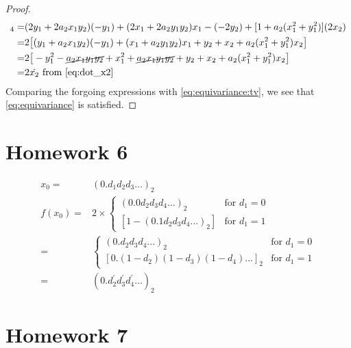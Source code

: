 \documentclass[]{article}
\begin{document}
\begin{proof}
	\begin{align*}
		[A(\vec{x}) t(\vec{x})]_4 =& (2y_1+2a_2x_1y_2)(-y_1) + (2x_1+2a_2y_1y_2)x_1 - (-2 y_2) + [1+a_2(x_1^2+ y_1^2)](2x_2)\\
		=&2\big[(y_1+a_2x_1y_2)(-y_1) + (x_1+a_2y_1y_2)x_1 + y_2 + x_2+a_2(x_1^2+ y_1^2)x_2\big]\\
		=&2\big[-y_1^2 - \cancel{a_2 x_1 y_1 y_2} +x_1^2 +  \cancel{a_2 x_1 y_1 y_2} + y_2 + x_2+ a_2(x_1^2+ y_1^2)x_2\big]\\
		=& 2 \dot{x_2}  \text{ from \eqref{eq:dot_x2}}
	\end{align*}
	Comparing the forgoing expressions with \eqref{eq:equivariance:tv}, we see that \eqref{eq:equivariance} is satisfied.
\end{proof}
\section{Homework 6}

\begin{align*}
	x_0 =& (0.d_1 d_2 d_3 ...)_2\\
	f(x_0) =& 2 \times \begin{cases}
		(0.0 d_2 d_3 d_4...)_2 & \text{for } d_1 = 0\\
		[1- (0.1 d_2 d_3 d_4...)_2] & \text{for } d_1 = 1
	\end{cases}\\
		=& \begin{cases}
			(0.d_2 d_3 d_4...)_2 & \text{for } d_1 = 0\\
			[0.(1-d_2) (1-d_3) (1-d_4)...]_2 & \text{for } d_1 = 1
		\end{cases}\\
	=& (0.d^\prime_2 d^\prime_3 d^\prime_4 ...)_2
\end{align*}
\section{Homework 7}
\end{document}
